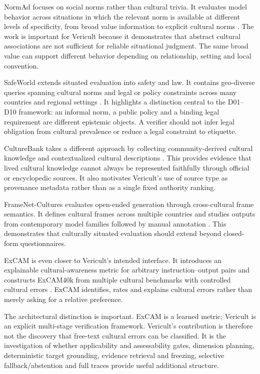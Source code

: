 NormAd focuses on social norms rather than cultural trivia. It evaluates model behavior across situations in which the relevant norm is available at different levels of specificity, from broad value information to explicit cultural norms \parencite{rao2025normad}. The work is important for Vericult because it demonstrates that abstract cultural associations are not sufficient for reliable situational judgment. The same broad value can support different behavior depending on relationship, setting and local convention.

SafeWorld extends situated evaluation into safety and law. It contains geo-diverse queries spanning cultural norms and legal or policy constraints across many countries and regional settings \parencite{yin2024safeworld}. It highlights a distinction central to the D01--D10 framework: an informal norm, a public policy and a binding legal requirement are different epistemic objects. A verifier should not infer legal obligation from cultural prevalence or reduce a legal constraint to etiquette.

CultureBank takes a different approach by collecting community-derived cultural knowledge and contextualized cultural descriptions \parencite{shi2024culturebank}. This provides evidence that lived cultural knowledge cannot always be represented faithfully through official or encyclopedic sources. It also motivates Vericult's use of source type as provenance metadata rather than as a single fixed authority ranking.

FrameNet-Cultures evaluates open-ended generation through cross-cultural frame semantics. It defines cultural frames across multiple countries and studies outputs from contemporary model families followed by manual annotation \parencite{jamshidi2026framenet}. This demonstrates that culturally situated evaluation should extend beyond closed-form questionnaires.

ExCAM is even closer to Vericult's intended interface. It introduces an explainable cultural-awareness metric for arbitrary instruction--output pairs and constructs ExCAM40k from multiple cultural benchmarks with controlled cultural errors \parencite{leiter2026excam}. ExCAM identifies, rates and explains cultural errors rather than merely asking for a relative preference.

The architectural distinction is important. ExCAM is a learned metric; Vericult is an explicit multi-stage verification framework. Vericult's contribution is therefore not the discovery that free-text cultural errors can be classified. It is the investigation of whether applicability and assessability gates, dimension planning, deterministic target grounding, evidence retrieval and freezing, selective fallback/abstention and full traces provide useful additional structure.


